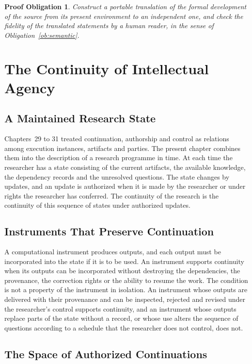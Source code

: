 \documentclass[11pt,letterpaper]{report}
\theoremstyle{plain}
\newtheorem{obligation}[theorem]{Proof Obligation}
\theoremstyle{definition}
\theoremstyle{remark}
\begin{document}
\begin{obligation}\label{ob:portability}
Construct a portable translation of the formal development of the source from its present environment to an independent one, and check the fidelity of the translated statements by a human reader, in the sense of Obligation~\ref{ob:semantic}.
\end{obligation}

\chapter{The Continuity of Intellectual Agency}

\section{A Maintained Research State}

Chapters~29 to 31 treated continuation, authorship and control as relations among execution instances, artifacts and parties. The present chapter combines them into the description of a research programme in time. At each time the researcher has a state consisting of the current artifacts, the available knowledge, the dependency records and the unresolved questions. The state changes by updates, and an update is authorized when it is made by the researcher or under rights the researcher has conferred. The continuity of the research is the continuity of this sequence of states under authorized updates.

\section{Instruments That Preserve Continuation}

A computational instrument produces outputs, and each output must be incorporated into the state if it is to be used. An instrument supports continuity when its outputs can be incorporated without destroying the dependencies, the provenance, the correction rights or the ability to resume the work. The condition is not a property of the instrument in isolation. An instrument whose outputs are delivered with their provenance and can be inspected, rejected and revised under the researcher's control supports continuity, and an instrument whose outputs replace parts of the state without a record, or whose use alters the sequence of questions according to a schedule that the researcher does not control, does not.

\section{The Space of Authorized Continuations}
\end{document}

